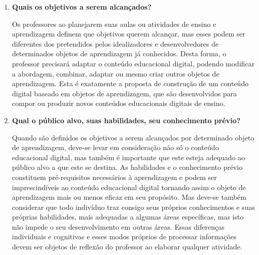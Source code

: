 \documentclass[12pt, openright, a4paper, brazil, english, french, spanish, bibjustif, openany, oneside]{abntex2}
\begin{document}





\begin{enumerate}[label=\textbf{\alph*)}]

\item \textbf{Quais os objetivos a serem alcançados?}

Os professores ao planejarem suas aulas ou atividades de ensino e aprendizagem definem que objetivos querem alcançar, mas esses podem ser diferentes dos pretendidos pelos idealizadores e desenvolvedores de determinados objetos de aprendizagem já conhecidos. Desta forma, o professor precisará adaptar o conteúdo educacional digital, podendo modificar a abordagem, combinar, adaptar ou mesmo criar outros objetos de aprendizagem.  Esta é exatamente a proposta de construção de um conteúdo digital baseado em objetos de aprendizagem, que são desenvolvidos para compor ou produzir novos conteúdos educacionais digitais de ensino.

\item \textbf{Qual o público alvo, suas habilidades, seu conhecimento prévio?}

Quando são definidos os objetivos a serem alcançados por determinado objeto de aprendizagem, deve-se levar em consideração não só o conteúdo educacional digital, mas também é importante que este esteja adequado ao público alvo a que este se destina. As habilidades e o conhecimento prévio constituem pré-requisitos necessários à aprendizagem e podem ser imprescindíveis ao conteúdo educacional digital tornando assim o objeto de aprendizagem mais ou menos eficaz em seu propósito. Mas deve-se também considerar que todo indivíduo traz consigo seus próprios conhecimentos e suas próprias habilidades, mais adequadas a algumas áreas específicas, mas isto não impede o seu desenvolvimento em outras áreas. Essas diferenças individuais e cognitivas e esses modos próprios de processar informações devem ser objetos de reflexão do professor ao elaborar qualquer atividade.


\end{enumerate}
\end{document}
